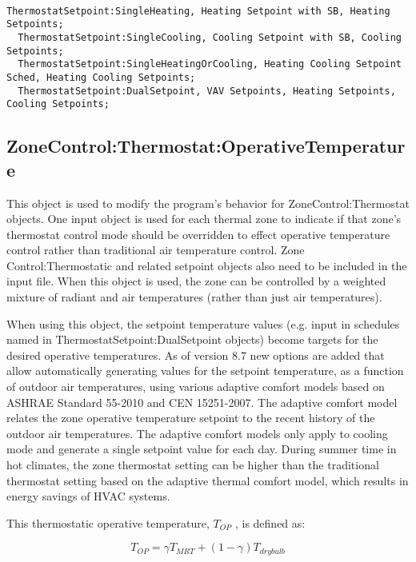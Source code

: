 \begin{lstlisting}

ThermostatSetpoint:SingleHeating, Heating Setpoint with SB, Heating Setpoints;
  ThermostatSetpoint:SingleCooling, Cooling Setpoint with SB, Cooling Setpoints;
  ThermostatSetpoint:SingleHeatingOrCooling, Heating Cooling Setpoint Sched, Heating Cooling Setpoints;
  ThermostatSetpoint:DualSetpoint, VAV Setpoints, Heating Setpoints, Cooling Setpoints;
\end{lstlisting}

\subsection{ZoneControl:Thermostat:OperativeTemperature}\label{zonecontrolthermostatoperativetemperature}

This object is used to modify the program's behavior for ZoneControl:Thermostat objects. One input object is used for each thermal zone to indicate if that zone's thermostat control mode should be overridden to effect operative temperature control rather than traditional air temperature control. Zone Control:Thermostatic and related setpoint objects also need to be included in the input file. When this object is used, the zone can be controlled by a weighted mixture of radiant and air temperatures (rather than just air temperatures). 

When using this object, the setpoint temperature values (e.g. input in schedules named in ThermostatSetpoint:DualSetpoint objects) become targets for the desired operative temperatures. As of version 8.7 new options are added that allow automatically generating values for the setpoint temperature, as a function of outdoor air temperatures, using various adaptive comfort models based on ASHRAE Standard 55-2010 and CEN 15251-2007. The adaptive comfort model relates the zone operative temperature setpoint to the recent history of the outdoor air temperatures.  The adaptive comfort models only apply to cooling mode and generate a single setpoint value for each day. During summer time in hot climates, the zone thermostat setting can be higher than the traditional thermostat setting based on the adaptive thermal comfort model, which results in energy savings of HVAC systems. 

This thermostatic operative temperature, \({T_{OP}}\) , is defined as:

\begin{equation}
{T_{OP}} = \gamma {T_{MRT}} + (1 - \gamma ){T_{drybulb}}
\end{equation}

